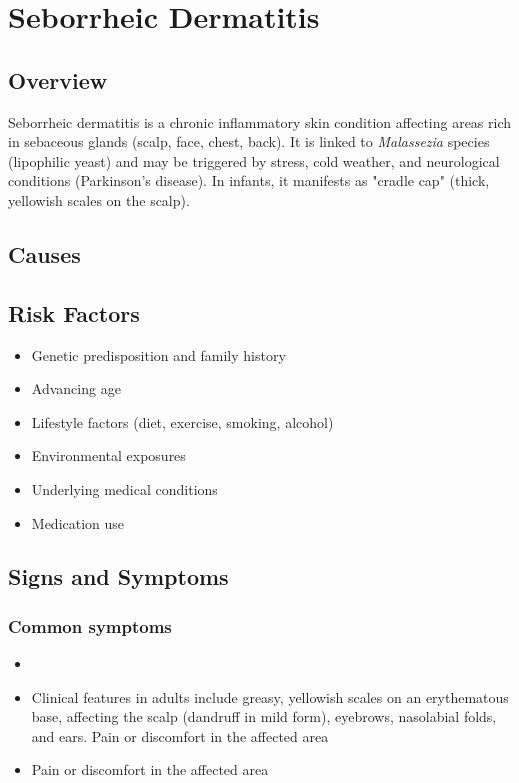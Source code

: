 \chapter{Seborrheic Dermatitis}
\label{sec:Seborrheic Dermatitis}

\section{Overview}
Seborrheic dermatitis is a chronic inflammatory skin condition affecting areas rich in sebaceous glands (scalp, face, chest, back). It is linked to \textit{Malassezia} species (lipophilic yeast) and may be triggered by stress, cold weather, and neurological conditions (Parkinson's disease). In infants, it manifests as "cradle cap" (thick, yellowish scales on the scalp).
\section{Causes}
\section{Risk Factors}

\begin{itemize}[noitemsep]
  \item Genetic predisposition and family history
  \item Advancing age
  \item Lifestyle factors (diet, exercise, smoking, alcohol)
  \item Environmental exposures
  \item Underlying medical conditions
  \item Medication use
\end{itemize}
\section{Signs and Symptoms}

\subsection{Common symptoms}
\begin{itemize}[noitemsep]
  \item \item Clinical features in adults include greasy, yellowish scales on an erythematous base, affecting the scalp (dandruff in mild form), eyebrows, nasolabial folds, and ears. Pain or discomfort in the affected area    \item Pain or discomfort in the affected area
  \end{itemize}

